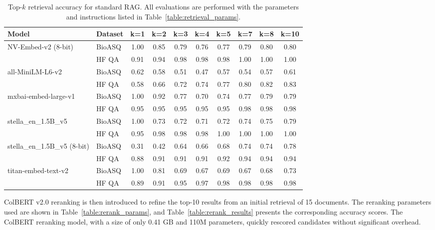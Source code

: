 \documentclass{scrartcl}
\begin{document}
\begin{table}[H]
\centering
\small
\begin{tabular}{l l c c c c c c c c}
\hline
\textbf{Model} & \textbf{Dataset} & \textbf{k=1} & \textbf{k=2} & \textbf{k=3} & \textbf{k=4} & \textbf{k=5} & \textbf{k=7} & \textbf{k=8} & \textbf{k=10} \\
\hline
\multirow{2}{*}{NV-Embed-v2 (8-bit)} 
 & BioASQ & 1.00 & 0.85 & 0.79 & 0.76 & 0.77 & 0.79 & 0.80 & 0.80 \\
 & HF QA  & 0.91 & 0.94 & 0.98 & 0.98 & 0.98 & 1.00 & 1.00 & 1.00 \\
\hline
\multirow{2}{*}{all-MiniLM-L6-v2} 
 & BioASQ & 0.62 & 0.58 & 0.51 & 0.47 & 0.57 & 0.54 & 0.57 & 0.61 \\
 & HF QA  & 0.58 & 0.66 & 0.72 & 0.74 & 0.77 & 0.80 & 0.82 & 0.83 \\
\hline
\multirow{2}{*}{mxbai-embed-large-v1} 
 & BioASQ & 1.00 & 0.92 & 0.77 & 0.70 & 0.74 & 0.77 & 0.79 & 0.79 \\
 & HF QA  & 0.95 & 0.95 & 0.95 & 0.95 & 0.95 & 0.98 & 0.98 & 0.98 \\
\hline
\multirow{2}{*}{stella\_en\_1.5B\_v5} 
 & BioASQ & 1.00 & 0.73 & 0.72 & 0.71 & 0.72 & 0.74 & 0.75 & 0.79 \\
 & HF QA  & 0.95 & 0.98 & 0.98 & 0.98 & 1.00 & 1.00 & 1.00 & 1.00 \\
\hline
\multirow{2}{*}{stella\_en\_1.5B\_v5 (8-bit)} 
 & BioASQ & 0.31 & 0.42 & 0.64 & 0.66 & 0.68 & 0.74 & 0.74 & 0.78 \\
 & HF QA  & 0.88 & 0.91 & 0.91 & 0.91 & 0.92 & 0.94 & 0.94 & 0.94 \\
\hline
\multirow{2}{*}{titan-embed-text-v2} 
 & BioASQ & 1.00 & 0.81 & 0.69 & 0.67 & 0.69 & 0.67 & 0.68 & 0.73 \\
 & HF QA  & 0.89 & 0.91 & 0.95 & 0.97 & 0.98 & 0.98 & 0.98 & 0.98 \\
\hline
\end{tabular}
\caption{Top-$k$ retrieval accuracy for standard RAG. All evaluations are performed with the parameters and instructions listed in Table~\ref{table:retrieval_params}.}
\label{table:standard_rag_results}
\end{table}

ColBERT v2.0 reranking is then introduced to refine the top-10 results from an initial retrieval of 15 documents. The reranking parameters used are shown in Table~\ref{table:rerank_params}, and Table~\ref{table:rerank_results} presents the corresponding accuracy scores. The ColBERT reranking model, with a size of only 0.41 GB and 110M parameters, quickly rescored candidates without significant overhead.
\end{document}
